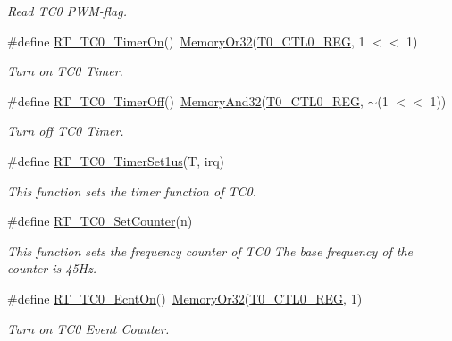 \begin{DoxyCompactItemize}
\begin{DoxyCompactList}\small\item\em Read T\+C0 P\+W\+M-\/flag. \end{DoxyCompactList}\item 
\#define \mbox{\hyperlink{a00041_aa7936fffa8b7bcd47751d2e89f81d4a9}{R\+T\+\_\+\+T\+C0\+\_\+\+Timer\+On}}()~\mbox{\hyperlink{a00020_a27874a97deab7cecdde5ddecf466e31e}{Memory\+Or32}}(\mbox{\hyperlink{a00020_adadaa0ab1ebbd7ba9b70dfd24c3ed44da869abf9d87f78f45a0e07ad352abb39e}{T0\+\_\+\+C\+T\+L0\+\_\+\+R\+EG}}, 1 $<$$<$ 1)
\begin{DoxyCompactList}\small\item\em Turn on T\+C0 Timer. \end{DoxyCompactList}\item 
\#define \mbox{\hyperlink{a00041_acbfad29faf802168f3281e5754e40aa9}{R\+T\+\_\+\+T\+C0\+\_\+\+Timer\+Off}}()~\mbox{\hyperlink{a00020_ad87cedffcaadc51db22594fce55173d4}{Memory\+And32}}(\mbox{\hyperlink{a00020_adadaa0ab1ebbd7ba9b70dfd24c3ed44da869abf9d87f78f45a0e07ad352abb39e}{T0\+\_\+\+C\+T\+L0\+\_\+\+R\+EG}}, $\sim$(1 $<$$<$ 1))
\begin{DoxyCompactList}\small\item\em Turn off T\+C0 Timer. \end{DoxyCompactList}\item 
\#define \mbox{\hyperlink{a00041_af8994aa8faed7529c93c25df30c020eb}{R\+T\+\_\+\+T\+C0\+\_\+\+Timer\+Set1us}}(T,  irq)
\begin{DoxyCompactList}\small\item\em This function sets the timer function of T\+C0. \end{DoxyCompactList}\item 
\#define \mbox{\hyperlink{a00041_ac299997dc05f47b4b42bfd4e52b98d36}{R\+T\+\_\+\+T\+C0\+\_\+\+Set\+Counter}}(n)
\begin{DoxyCompactList}\small\item\em This function sets the frequency counter of T\+C0 The base frequency of the counter is 45\+Hz. \end{DoxyCompactList}\item 
\#define \mbox{\hyperlink{a00041_a4dd8c922ad55805d587d5a73b78d911a}{R\+T\+\_\+\+T\+C0\+\_\+\+Ecnt\+On}}()~\mbox{\hyperlink{a00020_a27874a97deab7cecdde5ddecf466e31e}{Memory\+Or32}}(\mbox{\hyperlink{a00020_adadaa0ab1ebbd7ba9b70dfd24c3ed44da869abf9d87f78f45a0e07ad352abb39e}{T0\+\_\+\+C\+T\+L0\+\_\+\+R\+EG}}, 1)
\begin{DoxyCompactList}\small\item\em Turn on T\+C0 Event Counter. \end{DoxyCompactList}\item 

\end{DoxyCompactItemize}
